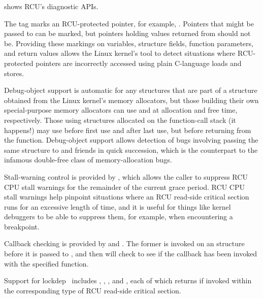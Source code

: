 shows RCU's diagnostic APIs.

The  tag marks an RCU-protected pointer, for example,
.
Pointers that might be passed to  can be marked,
but pointers holding values returned from 
should not be.
Providing these markings on variables, structure fields, function
parameters, and return values allows the Linux kernel's 
tool to detect situations where RCU-protected pointers are
incorrectly accessed using plain C-language loads and stores.

Debug-object support is automatic for any  structures
that are part of a structure obtained from the Linux kernel's
memory allocators, but those building their own special-purpose
memory allocators can use  and 
at allocation and free time, respectively.
Those using  structures allocated on the function-call
stack (it happens!\@) may use 
before first use and  after last use,
but before returning from the function.
Debug-object support allows detection of bugs involving passing the
same  structure to  and friends in
quick succession, which is the  counterpart to the
infamous double-free class of memory-allocation bugs.

Stall-warning control is provided by , which
allows the caller to suppress RCU CPU stall warnings for the remainder
of the current grace period.
RCU CPU stall warnings help pinpoint situations where an RCU read-side
critical section runs for an excessive length of time, and it is useful
for things like kernel debuggers to be able to suppress them, for example,
when encountering a breakpoint.

Callback checking is provided by  and
.
The former is invoked on an  structure before it is passed
to , and then  will
check to see if the callback has been invoked with the specified
function.

Support for lockdep~\cite{JonathanCorbet2006lockdep} includes
,
,
, and
,
each of which returns  if invoked within the corresponding
type of RCU read-side critical section.

